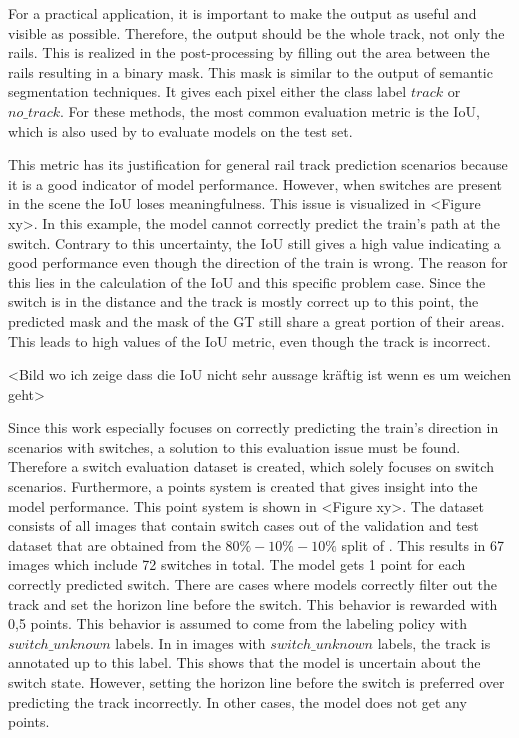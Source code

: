 For a practical application, it is important to make the output as useful and visible as possible.
Therefore, the output should be the whole track, not only the rails.
This is realized in the post-processing by filling out the area between the rails resulting in a binary mask.
This mask is similar to the output of semantic segmentation techniques.
It gives each pixel either the class label $track$ or $no\_track$.
For these methods, the most common evaluation metric is the \ac{IoU}, which is also used by \cite{tepNet2024} to evaluate models on the test set.

This metric has its justification for general rail track prediction scenarios because it is a good indicator of model performance.
However, when switches are present in the scene the \ac{IoU} loses meaningfulness.
This issue is visualized in <Figure xy>.
In this example, the model cannot correctly predict the train's path at the switch.
Contrary to this uncertainty, the \ac{IoU} still gives a high value indicating a good performance even though the direction of the train is wrong.
The reason for this lies in the calculation of the \ac{IoU} and this specific problem case.
Since the switch is in the distance and the track is mostly correct up to this point, the predicted mask and the mask of the \ac{GT} still share a great portion of their areas.
This leads to high values of the \ac{IoU} metric, even though the track is incorrect.

\vspace{1cm}
<Bild wo ich zeige dass die IoU nicht sehr aussage kräftig ist wenn es um weichen geht>
\vspace{1cm}

Since this work especially focuses on correctly predicting the train's direction in scenarios with switches, a solution to this evaluation issue must be found.
Therefore a switch evaluation dataset is created, which solely focuses on switch scenarios.
Furthermore, a points system is created that gives insight into the model performance.
This point system is shown in <Figure xy>.
The dataset consists of all images that contain switch cases out of the validation and test dataset that are obtained from the $80\%-10\%-10\%$ split of \cite{tepNet2024}.
This results in 67 images which include 72 switches in total.
The model gets 1 point for each correctly predicted switch.
There are cases where models correctly filter out the track and set the horizon line before the switch.
This behavior is rewarded with 0,5 points.
This behavior is assumed to come from the labeling policy with $switch\_unknown$ labels.
In \cite{tepNet2024} in images with $switch\_unknown$ labels, the track is annotated up to this label.
This shows that the model is uncertain about the switch state.
However, setting the horizon line before the switch is preferred over predicting the track incorrectly.
In other cases, the model does not get any points.

